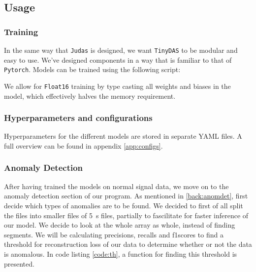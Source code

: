 \subsection{Usage}

\subsubsection{Training}

In the same way that \texttt{Judas} is designed, we want \texttt{TinyDAS} to be modular and easy to use. We've designed components in a way that is familiar to that of \texttt{Pytorch}. Models can be trained using the following script:



We allow for \texttt{Float16} training by type casting all weights and biases in the model, which effectively halves the memory requirement.

\subsubsection{Hyperparameters and configurations}

Hyperparameters for the different models are stored in separate YAML files. A full overview can be found in appendix \ref{app:configs}.


\subsubsection{Anomaly Detection}

After having trained the models on normal signal data, we move on to the anomaly detection section of our program. As mentioned in \ref{back:anomdet}, first decide which types of anomalies are to be found. We decided to first of all split the files into smaller files of \qty{5}{\si{\second}} files, partially to fascilitate for faster inference of our model. We decide to look at the whole array as whole, instead of finding segments. We will be calculating precisions, recalls and f1scores to find a threshold for reconstruction loss of our data to determine whether or not the data is anomalous. In code listing \ref{code:th}, a function for finding this threshold is presented.  \\




